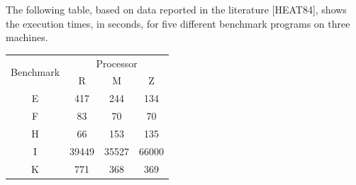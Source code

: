 \documentclass[12pt,largemargins]{homework}
\begin{document}
 The following table, based on data reported in the literature [HEAT84], shows
the execution times, in seconds, for five different benchmark programs on three
machines.\\
\begin{center}

\begin{tabular}{|c|c|c|c|}
	\hline
	\multirow{2}{*}{Benchmark} & \multicolumn{3}{|c|}{Processor} \\
	\cline{2-4}
	& R & M & Z \\
	\hline
	E & 417 & 244 & 134 \\
	\hline
	F & 83 & 70 & 70 \\
	\hline
	H & 66 & 153 & 135\\
	\hline 
	I & 39449 & 35527 & 66000\\
	\hline
	K & 771 & 368 & 369 \\
	\hline
\end{tabular}
\end{center}
\end{document}
